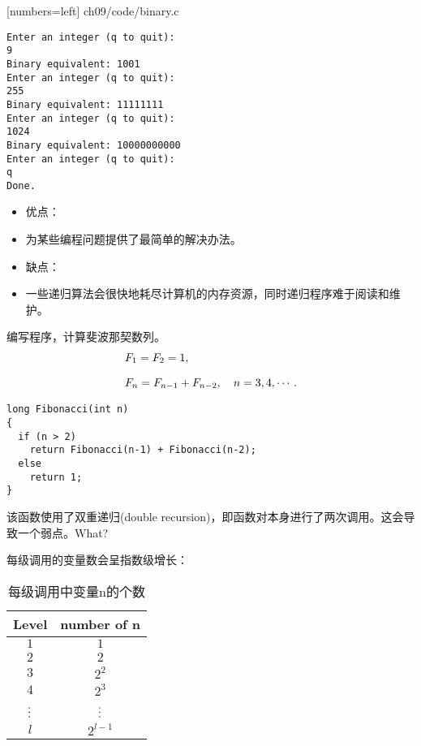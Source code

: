 \begin{frame}

  [numbers=left]
  {ch09/code/binary.c}
\end{frame}



\begin{frame}[fragile]
\begin{lstlisting}[backgroundcolor=\color{red!10}]
Enter an integer (q to quit):
9
Binary equivalent: 1001
Enter an integer (q to quit):
255
Binary equivalent: 11111111
Enter an integer (q to quit):
1024
Binary equivalent: 10000000000
Enter an integer (q to quit):
q
Done.
\end{lstlisting}
\end{frame}


\begin{frame}[fragile]
 

\begin{itemize}
\item 优点：
\item[] 
为某些编程问题提供了最简单的解决办法。\\[0.1in]
\item 缺点：
\item[]
一些递归算法会很快地耗尽计算机的内存资源，同时递归程序难于阅读和维护。
\end{itemize}

\end{frame}


\begin{frame}[fragile]
编写程序，计算斐波那契数列。
$$
\begin{aligned}
&F_1=F_2=1,\\[0.1in]
&F_n=F_{n-1}+F_{n-2}, \quad n=3,4,\cdots.
\end{aligned}
$$
\end{frame}


\begin{frame}[fragile]
\begin{lstlisting}
long Fibonacci(int n)
{
  if (n > 2)
    return Fibonacci(n-1) + Fibonacci(n-2);
  else
    return 1;
}
\end{lstlisting}

该函数使用了双重递归(double recursion)，即函数对本身进行了两次调用。这会导致一个弱点。{\Huge What?}
\end{frame}


\begin{frame}[fragile]
每级调用的变量数会呈指数级增长：
\begin{table}
\centering
\caption{每级调用中变量n的个数}
\begin{tabular}{cc}\hline
Level & number of n\\\hline
$1$ & $1$\\
$2$ & $2$\\
$3$ & $2^2$\\
$4$ & $2^3$\\
$\vdots$ & $\vdots$ \\
$l$ & $2^{l-1}$\\\hline
\end{tabular}
\end{table}
\end{frame}

